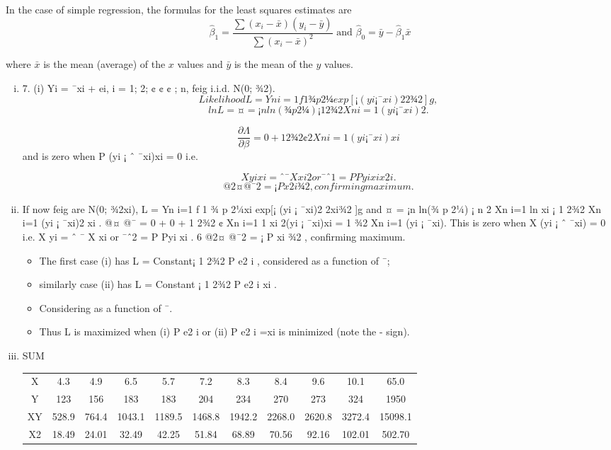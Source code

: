 \documentclass[a4paper,12pt]{article}
\begin{document}
\begin{framed}
In the case of simple regression, the formulas for the least squares estimates are 
\[{\displaystyle {\widehat {\beta }}_{1}={\frac {\sum (x_{i}-{\bar {x}})(y_{i}-{\bar {y}})}{\sum (x_{i}-{\bar {x}})^{2}}}{\text{ and }}{\widehat {\beta }}_{0}={\bar {y}}-{\widehat {\beta }}_{1}{\bar {x}}} \]

where 
$ {\displaystyle {\bar {x}}} $
 is the mean (average) of the 
$ {\displaystyle x} $
 values and 
${\displaystyle {\bar {y}}}$ 
 is the mean of the 
$ {\displaystyle y} $
 values.

\end{framed}
\begin{enumerate}[(i)]
\item 7. (i) Yi = ¯xi + ei, i = 1; 2; ¢ ¢ ¢ ; n, feig i.i.d. N(0; ¾2).
\[Likelihood L =
Yn
i=1
f
1
¾
p
2¼
exp[¡
(yi ¡ ¯xi)2
2¾2 ]g,\]
\[lnL = ¤ = ¡n ln(¾
p
2¼) ¡ 1
2¾2
Xn
i=1
(yi ¡ ¯xi)2.\]

\[
\frac{\partial \Lambda}{\partial \beta}

= 0 +
1
2¾2
¢ 2
Xn
i=1
(yi ¡ ¯xi)xi\] and is zero when
P
(yi ¡ ˆ ¯xi)xi = 0 i.e.

\[X
yixi = ˆ ¯
X
xi
2 or ¯ˆ1 =
P
Pyixi
x2
i
.\]
\[@2¤
@¯2 = ¡
P
x2
i
¾2 , confirming maximum.\]

\item  If now feig are N(0; ¾2xi),
L =
Yn
i=1
f
1
¾
p
2¼xi
exp[¡
(yi ¡ ¯xi)2
2xi¾2 ]g
and ¤ = ¡n ln(¾
p
2¼) ¡ n
2
Xn
i=1
ln xi ¡
1
2¾2
Xn
i=1
(yi ¡ ¯xi)2
xi
.
@¤
@¯
= 0 + 0 +
1
2¾2
¢
Xn
i=1
1
xi
2(yi ¡ ¯xi)xi =
1
¾2
Xn
i=1
(yi ¡ ¯xi).
This is zero when
X
(yi ¡ ˆ ¯xi) = 0 i.e.
X
yi = ˆ ¯
X
xi or ¯ˆ2 =
P
Pyi
xi
.
6
@2¤
@¯2 = ¡
P
xi
¾2 , confirming maximum.
\begin{itemize}
\item The first case (i) has L = Constant¡ 1
2¾2
P
e2
i , considered as a function of ¯;
\item similarly case (ii) has L = Constant ¡ 1
2¾2
P e2
i
xi
. 
\item Considering as a function
of ¯. 
\item Thus L is maximized when (i)
P
e2
i or (ii)
P
e2
i =xi is minimized (note
the - sign).
\end{itemize}
\item 
SUM
\begin{center}
\begin{tabular}{c|cccc|c|c|c|c|c|c|}
X & 4.3& 4.9& 6.5& 5.7& 7.2& 8.3 &8.4 &9.6 &10.1 &  65.0\\
Y & 123 & 156 & 183 & 183 & 204&  234 & 270& 273 & 324 & 1950\\
XY & 528.9 & 764.4& 1043.1 & 1189.5& 1468.8& 1942.2 & 2268.0& 2620.8& 3272.4 & 15098.1\\
X2 & 18.49& 24.01& 32.49& 42.25& 51.84 & 68.89&  70.56& 92.16& 102.01 & 502.70\\
\end{tabular}
\end{center}



\end{enumerate}
\end{document}

